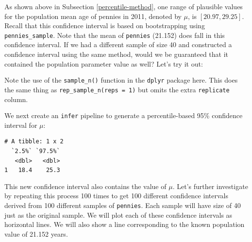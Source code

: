 \documentclass[12pt,]{krantz}
\makeatletter
\newenvironment{Shaded}{\begin{snugshade}}{\end{snugshade}}
\newcommand{\KeywordTok}[1]{\textcolor[rgb]{0.27,0.27,0.27}{\textbf{#1}}}
\newcommand{\DataTypeTok}[1]{\textcolor[rgb]{0.27,0.27,0.27}{#1}}
\newcommand{\DecValTok}[1]{\textcolor[rgb]{0.06,0.06,0.06}{#1}}
\newcommand{\StringTok}[1]{\textcolor[rgb]{0.5,0.5,0.5}{#1}}
\newcommand{\OtherTok}[1]{\textcolor[rgb]{0.37,0.37,0.37}{#1}}
\newcommand{\OperatorTok}[1]{\textcolor[rgb]{0.43,0.43,0.43}{\textbf{#1}}}
\newcommand{\NormalTok}[1]{#1}
\newenvironment{kframe}{%
\medskip{}
\setlength{\fboxsep}{.8em}
 \def\at@end@of@kframe{}%
 \ifinner\ifhmode%
  \def\at@end@of@kframe{\end{minipage}}%
  \begin{minipage}{\columnwidth}%
 \fi\fi%
 \def\FrameCommand##1{\hskip\@totalleftmargin \hskip-\fboxsep
 \colorbox{shadecolor}{##1}\hskip-\fboxsep
     \hskip-\linewidth \hskip-\@totalleftmargin \hskip\columnwidth}%
 \MakeFramed {\advance\hsize-\width
   \@totalleftmargin\z@ \linewidth\hsize
   \@setminipage}}%
 {\par\unskip\endMakeFramed%
 \at@end@of@kframe}
\renewenvironment{Shaded}{\begin{kframe}}{\end{kframe}}
\theoremstyle{definition}
\theoremstyle{definition}
\theoremstyle{definition}
\theoremstyle{remark}
\makeatother
\begin{document}
As shown above in Subsection \ref{percentile-method}, one range of
plausible values for the population mean age of pennies in 2011, denoted
by \(\mu\), is \([20.97, 29.25]\). Recall that this confidence interval
is based on bootstrapping using \texttt{pennies\_sample}. Note that the
mean of \texttt{pennies} (21.152) does fall in this confidence interval.
If we had a different sample of size 40 and constructed a confidence
interval using the same method, would we be guaranteed that it contained
the population parameter value as well? Let's try it out:

\begin{Shaded}
\end{Shaded}

Note the use of the \texttt{sample\_n()} function in the \texttt{dplyr}
package here. This does the same thing as
\texttt{rep\_sample\_n(reps\ =\ 1)} but omits the extra
\texttt{replicate} column.

We next create an \texttt{infer} pipeline to generate a percentile-based
95\% confidence interval for \(\mu\):

\begin{Shaded}
\end{Shaded}

\begin{verbatim}
# A tibble: 1 x 2
  `2.5%` `97.5%`
   <dbl>   <dbl>
1   18.4    25.3
\end{verbatim}

This new confidence interval also contains the value of \(\mu\). Let's
further investigate by repeating this process 100 times to get 100
different confidence intervals derived from 100 different samples of
\texttt{pennies}. Each sample will have size of 40 just as the original
sample. We will plot each of these confidence intervals as horizontal
lines. We will also show a line corresponding to the known population
value of 21.152 years.
\end{document}
